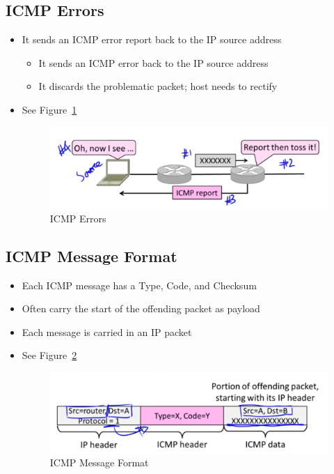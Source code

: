 \documentclass[12pt]{ctexart}   %
\begin{document}
	\subsection{ICMP Errors}
	\begin{itemize}
		\item It sends an ICMP error report back to the IP source address
		\begin{itemize}
			\item It sends an ICMP error back to the IP source address
			\item It discards the problematic packet; host needs to rectify
		\end{itemize}
		\item See Figure~\ref{fig:4-8-1}
		
		\begin{figure}[h!] %
		\centering
		 \includegraphics[scale=0.7]{images/4-8-1}
		\caption{ ICMP Errors }
		 \label{fig:4-8-1}
		 \end{figure}
	\end{itemize}
	
	\subsection{ICMP Message Format}
	\begin{itemize}
		\item Each ICMP message has a Type, Code, and Checksum
		\item Often carry the start of the offending packet as payload
		\item Each message is carried in an IP packet
		\item See Figure~\ref{fig:4-8-2}
		
		\begin{figure}[h!] %
		\centering
		 \includegraphics[scale=0.7]{images/4-8-2}
		\caption{ ICMP Message Format }
		 \label{fig:4-8-2}
		 \end{figure}
	\end{itemize}
	
\end{document}
